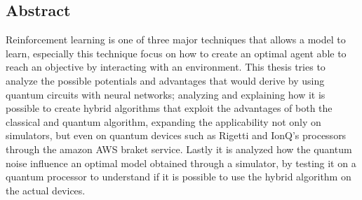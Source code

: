 \begin{center}
	\section*{Abstract}
\end{center}
Reinforcement learning is one of three major techniques that allows a model to learn, especially this technique focus on how to create an optimal agent able to reach an objective by interacting with an environment. 
This thesis tries to analyze the possible potentials and advantages that would derive by using quantum circuits with neural networks; 
analyzing and explaining how it is possible to create hybrid algorithms that exploit the advantages of both the classical and quantum algorithm, expanding the applicability not only on simulators, but even on quantum devices such as Rigetti and IonQ's processors through the amazon AWS braket service. 
Lastly it is analyzed how the quantum noise influence an optimal model obtained through a simulator, by testing it on a quantum processor to understand if it is possible to use the hybrid algorithm on the actual devices.
\newline
\begin{center}
	\printglossary
\end{center}
